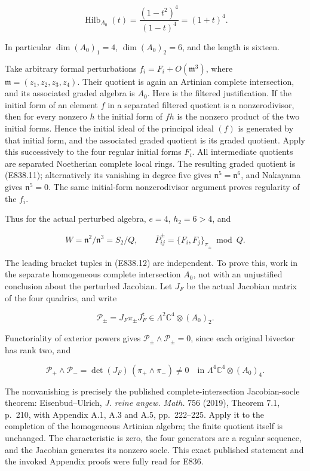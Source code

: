 \[
 \operatorname{Hilb}_{A_0}(t)
       =\frac{(1-t^2)^4}{(1-t)^4}=(1+t)^4.
 \tag{E838.11}
\]

In particular \(\dim(A_0)_1=4\), \(\dim(A_0)_2=6\), and the length is
sixteen.

Take arbitrary formal perturbations \(f_i=F_i+O(\mathfrak m^3)\), where
\(\mathfrak m=(z_1,z_2,z_3,z_4)\). Their quotient is again an Artinian
complete intersection, and its associated graded algebra is \(A_0\).
Here is the filtered justification. If the initial form of an element
\(f\) in a separated filtered quotient is a nonzerodivisor, then for
every nonzero \(h\) the initial form of \(fh\) is the nonzero product of
the two initial forms. Hence the initial ideal of the principal ideal
\((f)\) is generated by that initial form, and the associated graded
quotient is its graded quotient. Apply this successively to the four
regular initial forms \(F_i\). All intermediate quotients are separated
Noetherian complete local rings. The resulting graded quotient is
(E838.11); alternatively its vanishing in degree five gives
\(\mathfrak n^5=\mathfrak n^6\), and Nakayama gives \(\mathfrak n^5=0\).
The same initial-form nonzerodivisor argument proves regularity of the
\(f_i\).

Thus for the actual perturbed algebra, \(e=4\), \(h_2=6>4\), and

\[
 W=\mathfrak n^2/\mathfrak n^3=S_2/Q,\qquad
 \overline P^\pm_{ij}=\{F_i,F_j\}_{\pi_\pm}\bmod Q.
 \tag{E838.12}
\]

The leading bracket tuples in (E838.12) are independent. To prove this,
work in the separate homogeneous complete intersection \(A_0\), not with
an unjustified conclusion about the perturbed Jacobian. Let \(J_F\) be
the actual Jacobian matrix of the four quadrics, and write

\[
 \mathcal P_\pm=J_F\pi_\pm J_F^{\mathsf t}
       \in\Lambda^2\mathbb C^4\otimes(A_0)_2.
 \tag{E838.13}
\]

Functoriality of exterior powers gives
\(\mathcal P_\pm\wedge\mathcal P_\pm=0\), since each original bivector
has rank two, and

\[
 \mathcal P_+\wedge\mathcal P_-
       =\det(J_F)\,(\pi_+\wedge\pi_-)\ne0
       \quad\text{in }\Lambda^4\mathbb C^4\otimes(A_0)_4.
 \tag{E838.14}
\]

The nonvanishing is precisely the published complete-intersection
Jacobian-socle theorem: Eisenbud--Ulrich, \emph{J. reine angew. Math.}
756 (2019), Theorem 7.1, p.~210, with Appendix A.1, A.3 and A.5,
pp.~222--225. Apply it to the completion of the homogeneous Artinian
algebra; the finite quotient itself is unchanged. The characteristic is
zero, the four generators are a regular sequence, and the Jacobian
generates its nonzero socle. This exact published statement and the
invoked Appendix proofs were fully read for E836.

